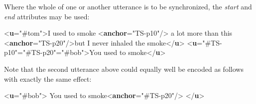 Where the whole of one or another utterance is to be synchronized, the {\itshape start} and {\itshape end} attributes may be used: \par\bgroup{}\exampleFont \begin{shaded}\noindent\mbox{}{<\textbf{u}\hspace*{1em}{who}="{\#tom}">}I used to smoke {<\textbf{anchor}\hspace*{1em}{xml:id}="{TS-p10}"/>} a lot more than this\mbox{}\newline 
{<\textbf{anchor}\hspace*{1em}{xml:id}="{TS-p20}"/>}but I never inhaled the smoke{</\textbf{u}>}\mbox{}\newline 
{<\textbf{u}\hspace*{1em}{start}="{\#TS-p10}"\hspace*{1em}{end}="{\#TS-p20}"\hspace*{1em}{who}="{\#bob}">}You used to smoke{</\textbf{u}>}\end{shaded}\egroup\par \noindent  Note that the second utterance above could equally well be encoded as follows with exactly the same effect: \par\bgroup{}\exampleFont \begin{shaded}\noindent\mbox{}{<\textbf{u}\hspace*{1em}{who}="{\#bob}">}\mbox{}\newline 
{}You used to smoke{<\textbf{anchor}\hspace*{1em}{synch}="{\#TS-p20}"/>}\mbox{}\newline 
{</\textbf{u}>}\end{shaded}\egroup\par \par
